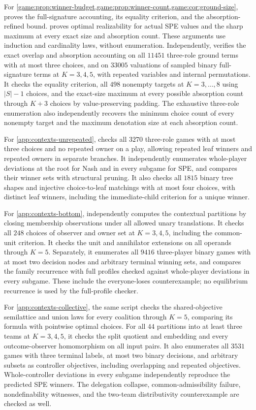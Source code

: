 For \cref{game:prop:winner-budget,game:prop:winner-count,game:cor:ground-size},
 proves the full-signature accounting,
its equality criterion, and the absorption-refined bound.
 proves optimal realizability for
actual SPE values and the sharp maximum at every exact size and
absorption count. These arguments use induction and cardinality laws,
without enumeration. Independently,  verifies the exact overlap and absorption
accounting on all $11451$ three-role ground terms with at most three
choices, and on $33005$ valuations of sampled binary full-signature
terms at $K=3,4,5$, with repeated variables and internal permutations.
It checks the equality criterion, all $498$ nonempty targets at
$K=3,\ldots,8$ using $|S|-1$ choices, and the exact-size maximum at
every possible absorption count through $K+3$ choices by
value-preserving padding. The exhaustive three-role enumeration also
independently recovers the minimum choice count of every nonempty
target and the maximum denotation size at each absorption count.

For \cref{app:contexts-unrepeated},  checks all
$3270$ three-role games with at most three choices and no repeated
owner on a play, allowing repeated leaf winners and repeated owners
in separate branches. It independently enumerates whole-player
deviations at the root for Nash and in every subgame for SPE, and
compares their winner sets with structural pruning. It also checks all
$1815$ binary tree shapes and injective choice-to-leaf matchings with
at most four choices, with distinct leaf winners, including the
immediate-child criterion for a unique winner.

For \cref{app:contexts-bottom},  independently
computes the contextual partitions by closing membership observations
under all allowed unary translations. It checks all $248$ choices of
observer and owner set at $K=3,4,5$, including the common-unit criterion.
It checks the unit and annihilator extensions on all operands through
$K=5$. Separately, it enumerates all $9416$ three-player binary games
with at most two decision nodes and arbitrary terminal winning sets,
and compares the family recurrence with full profiles checked against
whole-player deviations in every subgame. These include the
everyone-loses counterexample; no equilibrium recurrence is used by
the full-profile checker.

For \cref{app:contexts-collective}, the same script checks the
shared-objective semilattice and union laws for every coalition through
$K=5$, comparing its formula with pointwise optimal choices. For all
$44$ partitions into at least three teams at $K=3,4,5$, it checks the
split quotient and embedding and every outcome-observer homomorphism
on all input pairs. It also enumerates all $3531$ games with three
terminal labels, at most two binary decisions, and arbitrary subsets
as controller objectives, including overlapping and repeated
objectives. Whole-controller deviations in every subgame independently
reproduce the predicted SPE winners. The delegation collapse,
common-admissibility failure, nondefinability witnesses, and the
two-team distributivity counterexample are checked as well.

